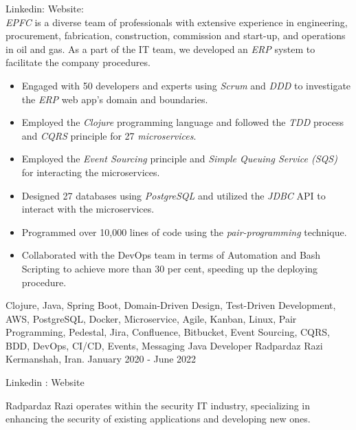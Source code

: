 \begin{experiences}
{
  Linkedin: 
  Website: \\
  \emph{EPFC} is a diverse team of professionals with extensive experience in engineering, procurement, fabrication, construction, commission and start-up, and operations in oil and gas. As a part of the IT team, we developed an \emph{ERP} system to facilitate the company procedures.
  \begin{itemize}
  \item Engaged with 50 developers and experts using \emph{Scrum} and \emph{DDD} to investigate the \textit{ERP} web app's domain and boundaries.
  \item Employed the \emph{Clojure} programming language and followed the \emph{TDD} process and \textit{CQRS} principle for 27 \emph{microservices}.
  \item Employed the \textit{Event Sourcing} principle and \textit{Simple Queuing Service (SQS)} for interacting the microservices.
  \item Designed 27 databases using \emph{PostgreSQL} and utilized the \emph{JDBC} API to interact with the microservices.
  \item Programmed over 10,000 lines of code using the \emph{pair-programming} technique.
  \item Collaborated with the DevOps team in terms of Automation and Bash Scripting to achieve more than 30 per cent, speeding up the deploying procedure.
  \end{itemize}}{Clojure, Java, Spring Boot, Domain-Driven Design, Test-Driven Development, AWS, PostgreSQL, Docker, Microservice, Agile, Kanban, Linux, Pair Programming, Pedestal, Jira, Confluence, Bitbucket, Event Sourcing, CQRS, BDD, DevOps, CI/CD, Events, Messaging}
 \emptySeparator
\experience
{}
{Java Developer}
{Radpardaz Razi}
{Kermanshah, Iran. \hspace{170 pt} January 2020 - June 2022}
{}
{
Linkedin : 
Website 
\par{Radpardaz Razi operates within the security IT industry, specializing in enhancing the security of existing applications and developing new ones.}
\begin{itemize}

\end{itemize}}
\end{experiences}
